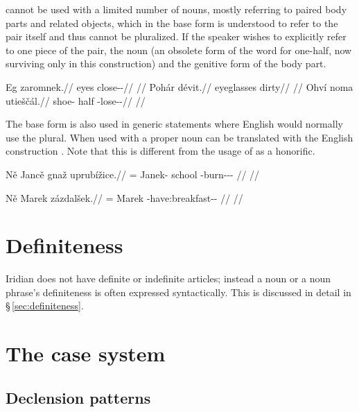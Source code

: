  cannot be used with a limited number of nouns, mostly referring to paired body parts and related objects, which in the base form is understood to refer to the pair itself and thus cannot be pluralized. If the speaker wishes to explicitly refer to one piece of the pair, the noun  (an obsolete form of the word for one-half, now surviving only in this construction) and the genitive form of the body part.

\pex
\begingl
\gla Eg zaromnek.//
\glb eyes close-\Pv{}-\Pf{}//
\glft {}//
\endgl
\xe
\pex
\begingl
\gla Pohár dévit.//
\glb eyeglasses dirty//
\glft {}//
\endgl
\xe
\pex
\begingl
\gla Ohví noma utieščál.//
\glb shoe-\Gen{} half \Refl{}-lose-\Av{}-\Cont{}//
\glft {}//
\endgl
\xe

The base form is also used in generic statements where English would normally use the plural. When used with a proper noun  can be translated with the English construction . Note that this is different from the usage of  as a honorific.

\pex
\begingl
    \gla Ně Janc\v{e} gnaž uprubížice.//
    \glb \Pl{}= Janek-\Gen{} school \Refl{}-burn-\Av{}-\Pf{}-\Quot{} //
    \glft {}//
\endgl
\xe

\pex
\begingl
    \gla Ně Marek zázdalšek.//
    \glb \Pl{}= Marek \Neg{}-have:breakfast-\Av{}-\Pf{} //
    \glft {}//
\endgl
\xe


\section{Definiteness}
Iridian does not have definite or indefinite articles; instead a noun or a noun phrase's definiteness is often expressed syntactically. This is discussed in detail in \S\,\ref{sec:definiteness}.

\section{The case system}

\subsection{Declension patterns}

